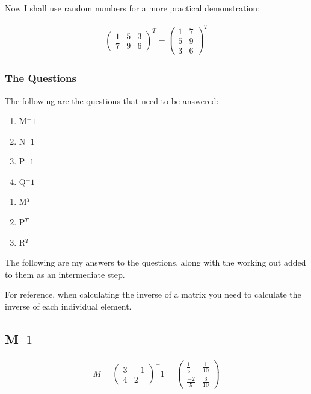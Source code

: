 \documentclass[a4paper,10pt]{article}
\begin{document}
        Now I shall use random numbers for a more practical demonstration:

        \begin{align*}
          \begin{pmatrix}
            1 & 5 & 3\\
            7 & 9 & 6
          \end{pmatrix}
          ^T
           =
          \begin{pmatrix}
            1 & 7\\
            5 & 9\\
            3 & 6
          \end{pmatrix}
          ^T
        \end{align*}

        \subsubsection{The Questions}
        The following are the questions that need to be answered:
        \begin{enumerate}
          \item M$^-1$
          \item N$^-1$
          \item P$^-1$
          \item Q$^-1$
        \end{enumerate}
        \begin{enumerate}
          \item M$^T$
          \item P$^T$
          \item R$^T$
        \end{enumerate}

        The following are my answers to the questions, along with the working out added to them as an intermediate step.

        For reference, when calculating the inverse of a matrix you need to calculate the inverse of each individual element.

        \subsection{M$^-1$}
          \begin{align*}
            M =
            \begin{pmatrix}
              3 & -1\\
              4 &  2
            \end{pmatrix}
            ^-1
            =
            \begin{pmatrix}
              \frac{1}{5} & \frac{1}{10}\\
             \frac{-2}{5} & \frac{3}{10}
            \end{pmatrix}
          \end{align*}
\end{document}
